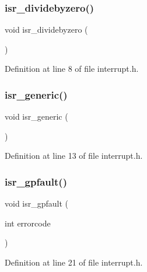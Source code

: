 \subsubsection{\texorpdfstring{isr\+\_\+dividebyzero()}{isr\_dividebyzero()}}
{\footnotesize\ttfamily void isr\+\_\+dividebyzero (\begin{DoxyParamCaption}{ }\end{DoxyParamCaption})}



Definition at line 8 of file interrupt.\+h.

\mbox{\label{a00020_a13f7b685594468a92abb85e03148fb54_a13f7b685594468a92abb85e03148fb54}} 
\subsubsection{\texorpdfstring{isr\+\_\+generic()}{isr\_generic()}}
{\footnotesize\ttfamily void isr\+\_\+generic (\begin{DoxyParamCaption}{ }\end{DoxyParamCaption})}



Definition at line 13 of file interrupt.\+h.

\mbox{\label{a00020_af6ac5b24d3c1b69d4272012baa895291_af6ac5b24d3c1b69d4272012baa895291}} 
\subsubsection{\texorpdfstring{isr\+\_\+gpfault()}{isr\_gpfault()}}
{\footnotesize\ttfamily void isr\+\_\+gpfault (\begin{DoxyParamCaption}\item[{int}]{errorcode }\end{DoxyParamCaption})}



Definition at line 21 of file interrupt.\+h.

\mbox{\label{a00020_a03a1497db52d629138dba59ddafcbc32_a03a1497db52d629138dba59ddafcbc32}} 

